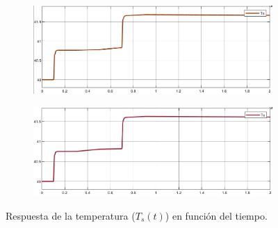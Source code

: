 \documentclass{article}
\begin{document}
\begin{figure}[H]
    \centering
    \begin{subfigure}[b]{0.8\textwidth}
        \includegraphics[width=\textwidth]{5.1.6_temperatura.jpg}
    \end{subfigure}
    \begin{subfigure}[b]{0.8\textwidth}
        \includegraphics[width=1\textwidth]{5.1.6_temperatura_NL.jpg}
    \end{subfigure}
    \caption{Respuesta de la temperatura ($T_s(t)$) en función del tiempo.}
    \label{fig:temperatura}
\end{figure}
\end{document}
